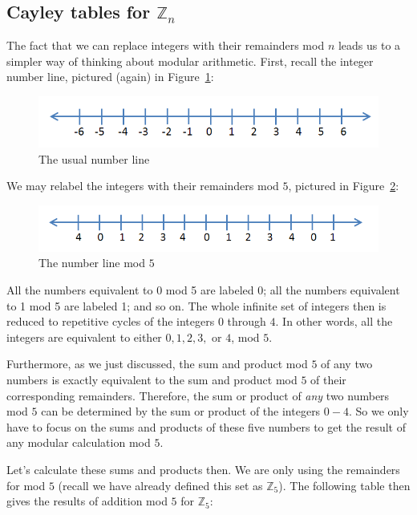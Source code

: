 \subsection{Cayley tables for ${\mathbb Z}_n$}
The fact that we can replace integers with their remainders mod $n$ leads us to a simpler way of  thinking about modular arithmetic.  First, recall the integer number line, pictured (again) in Figure~\ref{fig:integers}:
\begin{figure}[h]
\begin{center}
\includegraphics[width=4.5in]{images/integer_line.png}
\end{center}
\caption{The usual number line\label{fig:integers}}
\end{figure}
We may relabel the integers with their remainders mod $5$, pictured in Figure~\ref{fig:integers_mod_5}:
\begin{figure}[h]
\begin{center}
\includegraphics[width=4.5in]{images/integers_mod_5.png}
\end{center}
\caption{The number line mod $5$ \label{fig:integers_mod_5}}
\end{figure}
All the numbers equivalent to 0 mod 5 are labeled 0; all the numbers equivalent to 1 mod 5 are labeled 1; and so on.  The whole infinite set of integers then is reduced to repetitive cycles of the integers $0$ through $4$.  In other words, all the integers are equivalent to either $0, 1, 2, 3,$ or $4$, mod $5$.  

Furthermore, as we just discussed, the sum and product mod $5$ of any two numbers is exactly equivalent to the sum and product mod $5$ of their corresponding remainders.  Therefore, the sum or product of \emph{any} two numbers mod $5$ can be determined by the sum or product of the integers $0-4$.  So we only have to focus on the sums and products of these five numbers to get the result of any modular calculation mod $5$.  

Let's calculate these sums and products then.  We are only using the remainders for mod $5$ (recall we have already defined this set as  ${\mathbb Z}_{5}$).
The following table then gives the results of addition mod $5$ for ${\mathbb Z}_{5}$:

